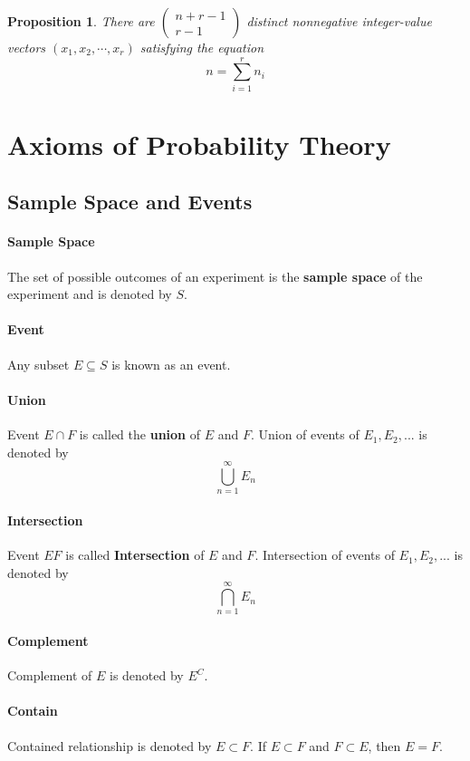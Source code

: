 \documentclass[12pt]{article}
\newtheorem{proposition}{Proposition}[subsection]
\begin{document}
    \begin{proposition}
        There are $\left( \begin{array}{c} n+r-1\\ r-1 \end{array}\right)$ distinct nonnegative integer-value vectors $(x_1, x_2, \cdots, x_r)$ satisfying the equation
        \begin{equation}
            n = \sum_{i=1}^rn_i
        \end{equation}
    \end{proposition}

\section{Axioms of Probability Theory}
    \subsection{Sample Space and Events}
    \paragraph{Sample Space}The set of possible outcomes of an experiment is the \textbf{sample space} of the experiment and is denoted by $S$.
    \paragraph{Event}Any subset $E \subseteq S$ is known as an event.
    \paragraph{Union}Event $E \cap F$ is called the \textbf{union} of $E$ and $F$. Union of events of $E_1, E_2, ...$ is denoted by 
    \[\bigcup_{n=1}^{\infty}E_n\]
    \paragraph{Intersection}Event $EF$ is called \textbf{Intersection} of $E$ and $F$. Intersection of events of $E_1, E_2, ...$ is denoted by 
    \[\bigcap_{n=1}^{\infty}E_n\]
    
    \paragraph{Complement}Complement of $E$ is denoted by $E^C$.
    \paragraph{Contain}Contained relationship is denoted by $E \subset F$. If $E \subset F$ and $F \subset E$, then $E = F$.
    
\end{document}
